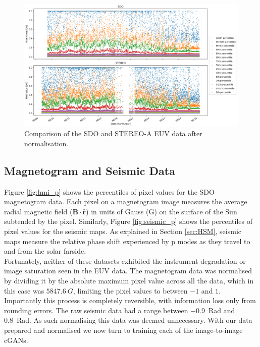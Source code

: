 \documentclass[11pt,a4paper,onecolumn]{report}
\begin{document}
\begin{figure}[t]
  \centering
  \includegraphics[width=\linewidth]{AIA_STEREO_normalised.png}
  \caption{Comparison of the SDO and STEREO-A EUV data after normalisation.}
  \label{fig:sdo_stereo_comparison}
\end{figure}



\subsection{Magnetogram and Seismic Data}
Figure \ref{fig:hmi_p} shows the percentiles of pixel values for the SDO
magnetogram data. Each pixel on a magnetogram image measures the average radial
magnetic field ($\mathbf{B}\cdot\mathbf{\hat{r}}$) in units of Gauss (G) on the
surface of the Sun subtended by the pixel. Similarly, Figure \ref{fig:seismic_p}
shows the percentiles of pixel values for the seismic maps. As explained in
Section \ref{sec:HSM}, seismic maps measure the relative phase shift experienced
by p modes as they travel to and from the solar farside. \\

Fortunately, neither of these datasets exhibited the instrument degradation or
image saturation seen in the EUV data. The magnetogram data was normalised by
dividing it by the absolute maximum pixel value across all the data, which in
this case was $\SI[]{5847.6}[]{G}$, limiting the pixel values to between $-1$
and $1$. Importantly this process is completely reversible, with information
loss only from rounding errors. The raw seismic data had a range between
\SI{-0.9}{Rad} and \SI{0.8}{Rad}. As such normalising this data was deemed
unnecessary. %
With our data prepared and normalised we now turn to training each of the
image-to-image cGANs.
\end{document}
